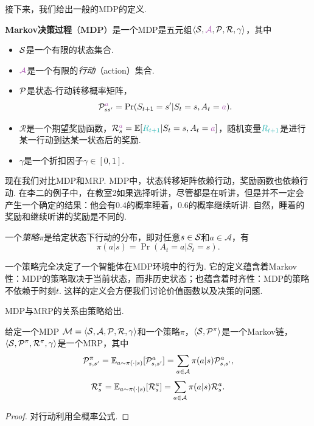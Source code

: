 接下来，我们给出一般的MDP的定义.
\begin{definition}
\textbf{Markov决策过程}（\textbf{MDP}）是一个MDP是五元组$\langle\calS, \light{\mathcal A}, \calP, \mathcal R, \gamma\rangle$，其中
\begin{itemize}
    \item $\mathcal S$是一个有限的状态集合.
    \item $\light{\mathcal A}$是一个有限的\textit{行动}（action）集合.
    \item $\mathcal P$是状态-行动转移概率矩阵，
    \[\calP_{ss'}^{\light{a}} = \Pr(S_{t+1} = s' | S_t = s, A_t = \light{a}).\]
    \item $\mathcal R$是一个期望奖励函数，$\mathcal R_s^{\light{a}} = \E[\contrastlight{R_{t+1}} | S_t = s, A_t = \light{a}]$，随机变量$\contrastlight{R_{t+1}}$是进行某一行动到达某一状态后的奖励.
    \item $\gamma$是一个折扣因子$\gamma\in[0,1]$.
\end{itemize}
\end{definition}

现在我们对比MDP和MRP. MDP中，状态转移矩阵依赖行动，奖励函数也依赖行动. 在李二的例子中，在教室2如果选择听讲，尽管都是在听讲，但是并不一定会产生一个确定的结果：他会有$0.4$的概率睡着，$0.6$的概率继续听讲. 自然，睡着的奖励和继续听讲的奖励是不同的.

\begin{definition}[策略]
一个\textit{策略}$\pi$是给定状态下行动的分布，即对任意$s\in\mathcal S$和$a\in\mathcal A$，有
    \[\pi(a|s) = \Pr(A_t=a | S_t = s).\]
\end{definition}
一个策略完全决定了一个智能体在MDP环境中的行为. 它的定义蕴含着Markov性：MDP的策略取决于当前状态，而非历史状态；也蕴含着时齐性：MDP的策略不依赖于时刻$t$. 这样的定义会方便我们讨论价值函数以及决策的问题.

MDP与MRP的关系由策略给出. 
\begin{proposition}
给定一个MDP $\mathcal M=\langle\mathcal S,\mathcal A,\mathcal P,\mathcal R, \gamma\rangle$和一个策略$\pi$，$\langle \mathcal S, \mathcal P^{\pi}\rangle$是一个Markov链，$\langle\mathcal S,\mathcal P^{\pi}, \mathcal R^{\pi}, \gamma\rangle$是一个MRP，其中
\[\mathcal P_{s,s'}^{\pi} = \mathbb{E}_{a\sim\pi(\cdot|s)}[\mathcal P^a_{s,s'}]=\sum_{a\in \mathcal A}\pi(a|s)\mathcal P_{s,s'}^{a},\]
    \[\mathcal R_s^{\pi} =\mathbb{E}_{a\sim\pi(\cdot|s)}[\mathcal R^a_s]=\sum_{a\in\mathcal A}\pi(a|s)\mathcal R_s^a.\]
\end{proposition}
\begin{proof}
对行动利用全概率公式. 
\end{proof}

